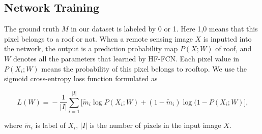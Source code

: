 \subsection{Network Training}
\setlength{\parindent}{2ex}The ground truth $M$ in our dataset is labeled by 0 or 1. Here 1,0 means that this pixel belongs to a roof or not. When a remote sensing image ${X}$ is inputted into the network, the output is a prediction probability map $P(X;W)$ of roof, and $W$ denotes all the parameters that learned by HF-FCN. Each pixel value in $P(X_{i};W)$ means the probability of this pixel belongs to rooftop. We use the sigmoid cross-entropy loss function formulated as
\begin{small}
\begin{equation}
     \label{loss}
     \ L(W)\! =\! -\frac{1}{\vert I\vert}\sum_{i=1}^{\vert I \vert}\lbrack{\tilde{m}_i \log{P(X_{i};W)}\!+\!(1\!-\!\tilde{m}_i)\log(1\!-\!P(X_{i};W)}\rbrack,
\end{equation}
\end{small}
where $\tilde{m}_i$ is label of $X_{i}$, ${\vert I\vert}$ is the number of pixels in the input image ${X}$.